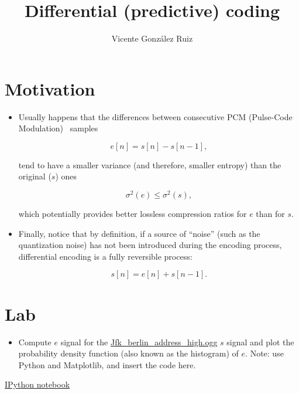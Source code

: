 
\title{Differential (predictive) coding}

\author{Vicente González Ruiz}

\maketitle

\section{Motivation}
\begin{itemize}
\item
  Usually happens that the differences between consecutive PCM
  (Pulse-Code Modulation)~\cite{oppenheim1999discrete, oppenheim2014discrete} samples

  \[
    e[n] = s[n] - s[n-1],
  \]

  tend to have a smaller variance (and therefore, smaller entropy) than
  the original (\(s\)) ones

  \[
    \sigma^2(e) \leq \sigma^2(s),
  \]

  which potentially provides better lossless compression ratios for
  \(e\) than for \(s\).
\item
  Finally, notice that by definition, if a source of ``noise'' (such as
  the quantization noise) has not been introduced during the encoding
  process, differential encoding is a fully reversible process:

  \[
    s[n] = e[n] + s[n-1].
  \]
\end{itemize}

\section{Lab}

\begin{itemize}
\tightlist
\item
  Compute \(e\) signal for the
  \href{https://upload.wikimedia.org/wikipedia/commons/3/3a/Jfk_berlin_address_high.ogg}{Jfk\_berlin\_address\_high.ogg}
  \(s\) signal and plot the probability density function (also known as
  the histogram) of \(e\). Note: use Python and Matplotlib, and insert
  the code here.
\end{itemize}

\href{https://nbviewer.jupyter.org/github/vicente-gonzalez-ruiz/differential_coding/blob/master/LZW.ipynb}{IPython notebook}

